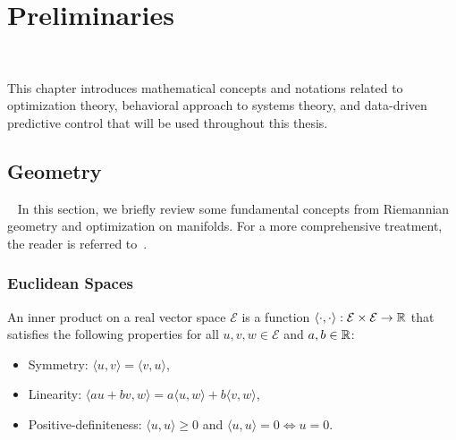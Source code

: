 \chapter{Preliminaries}~\label{ch:Preliminaries}

This chapter introduces mathematical concepts and notations related to optimization theory, behavioral approach to systems theory, and data-driven predictive control that will be used throughout this thesis.

\section{Geometry}~\label{sec:opt}
In this section, we briefly review some fundamental concepts from Riemannian geometry and optimization on manifolds. For a more comprehensive treatment, the reader is referred to~\cite{absil,boumal2023}.

\subsection{Euclidean Spaces}
\begin{definition}\label{def:euc-inner-prod}
    An inner product on a real vector space $\mathcal{E}$ is a function $\langle \cdot, \cdot \rangle : \mathcal{E} \times \mathcal{E} \to \mathbb{R}$ that satisfies the following properties for all $u,v,w \in \mathcal{E}$ and $a,b \in \mathbb{R}$:
    \begin{itemize}
        \item Symmetry: $\langle u, v \rangle = \langle v, u \rangle$,
        \item Linearity: $\langle au + bv, w \rangle = a\langle u, w \rangle + b\langle v, w \rangle$,
        \item Positive-definiteness: $\langle u, u \rangle \geq 0$ and $\langle u, u \rangle = 0 \iff u = 0$.
    \end{itemize}

\end{definition}

